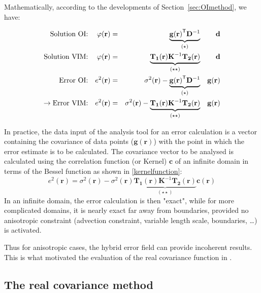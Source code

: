 Mathematically, according to the developments of Section~\ref{sec:OImethod}, we have:

\begin{align}
\textrm{Solution OI:} 	&	& \varphi(\mathbf{r}) &=& \underbrace{\mathbf{g}{(\mathbf{r})}^\mathsf{T}\mathbf{D}^{-1}}_{(\star)}		&& \mathbf{d}\\
\textrm{Solution VIM:}	&	& \varphi(\mathbf{r}) &=& \underbrace{\mathbf{T_{1}}(\mathbf{r})\mathbf{K}^{-1} \mathbf{T_{2}}(\mathbf{r})}_{(\star\star)} 																								&&\mathbf{d}\\
\textrm{Error~OI:}  	& 	& e^{2}(\mathbf{r})   &=& \sigma^{2}(\mathbf{r})-\underbrace{\mathbf{g}{(\mathbf{r})}^\mathsf{T}\mathbf{D}^{-1}}_{(\star)}														&&\mathbf{g}(\mathbf{r})	\\		
\rightarrow \textrm{Error~VIM:}		& 	& e^{2}(\mathbf{r})   &=& \sigma^{2}(\mathbf{r})-\underbrace{\mathbf{T_{1}}(\mathbf{r})\mathbf{K}^{-1} \mathbf{T_{2}}(\mathbf{r})}_{(\star\star)}		&&\mathbf{g}(\mathbf{r})
\end{align}

In practice, the data input of the analysis tool for an error calculation is a vector containing the
covariance of data points ($\mathbf{g}(\mathbf{r})$) with the point in which the error estimate is to be calculated. The covariance vector to be analysed is calculated using the correlation function (or Kernel) $\mathbf{c}$ of an infinite domain in terms of the Bessel function as shown in \eqref{kernelfunction}:
\begin{equation}
e^{2}(\mathbf{r})   = \sigma^{2}(\mathbf{r})-\sigma^{2}(\mathbf{r}) \underbrace{\mathbf{T_{1}}(\mathbf{r})\mathbf{K}^{-1} \mathbf{T_{2}}(\mathbf{r})}_{(\star\star)}		\mathbf{c}(\mathbf{r})
\label{eq:kernelbessel}
\end{equation}
In an infinite domain, the error calculation is then "exact", while for more complicated domains, it is nearly exact far away from boundaries, provided no anisotropic constraint (advection constraint, variable length scale, boundaries, \ldots) is activated. 

Thus for anisotropic cases, the hybrid error field can provide incoherent results. This is what motivated the evaluation of the real covariance function in \diva.


\subsection{The real covariance method\label{sec:realcovariance}}

